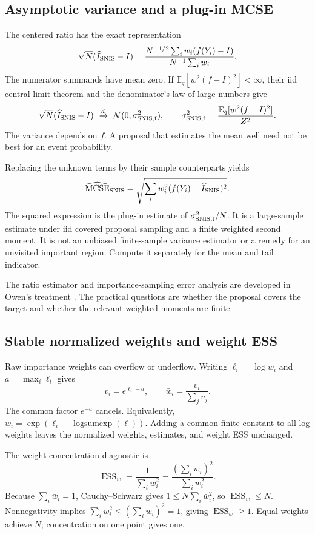 \documentclass[11pt,a4paper]{article}
\newcommand{\E}{\mathbb E}
\newcommand{\Normal}{\mathcal N}
\newcommand{\MCSE}{\operatorname{MCSE}}
\newcommand{\ESS}{\operatorname{ESS}}
\begin{document}
\subsection{Asymptotic variance and a plug-in MCSE}
The centered ratio has the exact representation
\[
 \sqrt N(\widehat I_{\rm SNIS}-I)
 =\frac{N^{-1/2}\sum_iw_i(f(Y_i)-I)}{N^{-1}\sum_iw_i}.
\]
The numerator summands have mean zero. If
$\E_q[w^2(f-I)^2]<\infty$, their iid central limit theorem and the
denominator's law of large numbers give
\[
 \sqrt N(\widehat I_{\rm SNIS}-I)
 \ \xrightarrow{d}\ \Normal(0,\sigma_{\rm SNIS,f}^2),\qquad
 \sigma_{\rm SNIS,f}^2=\frac{\E_q[w^2(f-I)^2]}{Z^2}.
\]
The variance depends on $f$. A proposal that estimates the mean well need
not be best for an event probability.

Replacing the unknown terms by their sample counterparts yields
\[
 \widehat{\MCSE}_{\rm SNIS}
 =\sqrt{\sum_i\bar w_i^2(f(Y_i)-\widehat I_{\rm SNIS})^2}.
\]
The squared expression is the plug-in estimate of
$\sigma_{\rm SNIS,f}^2/N$. It is a large-sample estimate under iid covered
proposal sampling and a finite weighted second moment. It is not an unbiased
finite-sample variance estimator or a remedy for an unvisited important region.
Compute it separately for the mean and tail indicator.

The ratio estimator and importance-sampling error analysis are developed in
Owen's treatment \cite{owen}. The practical questions are whether the proposal
covers the target and whether the relevant weighted moments are finite.

\subsection{Stable normalized weights and weight ESS}
Raw importance weights can overflow or underflow. Writing
$\ell_i=\log w_i$ and $a=\max_i\ell_i$ gives
\[
 v_i=e^{\ell_i-a},\qquad \bar w_i=\frac{v_i}{\sum_jv_j}.
\]
The common factor $e^{-a}$ cancels. Equivalently,
$\bar w_i=\exp(\ell_i-\operatorname{logsumexp}(\ell))$.
Adding a common finite constant to all log weights leaves the normalized
weights, estimates, and weight ESS unchanged.

The weight concentration diagnostic is
\[
 \ESS_w=\frac1{\sum_i\bar w_i^2}
 =\frac{(\sum_iw_i)^2}{\sum_iw_i^2}.
\]
Because $\sum_i\bar w_i=1$, Cauchy--Schwarz gives
$1\le N\sum_i\bar w_i^2$, so $\ESS_w\le N$. Nonnegativity implies
$\sum_i\bar w_i^2\le(\sum_i\bar w_i)^2=1$, giving $\ESS_w\ge1$.
Equal weights achieve $N$; concentration on one point gives one.
\end{document}
